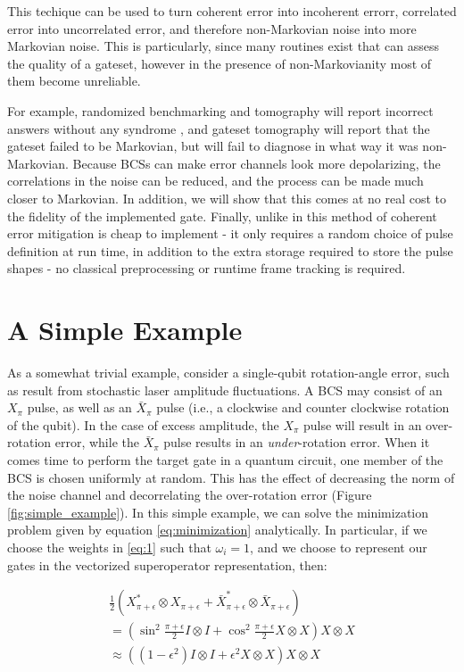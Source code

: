 \documentclass[aps,nofootinbib,pra,notitlepage,twocolumn]{revtex4-1}
\begin{document}
This techique can be used to turn coherent error into incoherent errorr, correlated error into uncorrelated error, and therefore non-Markovian noise into more Markovian noise. This is particularly, since many routines exist that can assess the quality of a gateset, however in the presence of non-Markovianity most of them become unreliable.

For example, randomized benchmarking and tomography will report incorrect answers without any syndrome \cite{Merkel2013}, and gateset tomography will report that the gateset failed to be Markovian, but will fail to diagnose in what way it was non-Markovian. Because BCSs can make error channels look more depolarizing, the correlations in the noise can be reduced, and the process can be made much closer to Markovian. In addition, we will show that this comes at no real cost to the fidelity of the implemented gate. Finally, unlike in \cite{Wallman2016, Campbell2017, Ware2018} this method of coherent error mitigation is cheap to implement - it only requires a random choice of pulse definition at run time, in addition to the extra storage required to store the pulse shapes - no classical preprocessing or runtime frame tracking is required.


\section{A Simple Example}
As a somewhat trivial example, consider a single-qubit rotation-angle error, such as result from stochastic laser amplitude fluctuations. A BCS may consist of an $X_\pi$ pulse, as well as an $\bar X_\pi$ pulse (i.e., a clockwise and counter clockwise rotation of the qubit). In the case of excess amplitude, the $X_\pi$ pulse will result in an over-rotation error, while the $\bar X_\pi$ pulse results in an \emph{under}-rotation error. When it comes time to perform the target gate in a quantum circuit, one member of the BCS is chosen uniformly at random. This has the effect of decreasing the norm of the noise channel and decorrelating the over-rotation error (Figure \ref{fig:simple_example}). In this simple example, we can solve the minimization problem given by equation \ref{eq:minimization} analytically. In particular, if we choose the weights in \ref{eq:1} such that $\omega_i=1$, and we choose to represent our gates in the vectorized superoperator representation, then:

\begin{equation}
  \begin{gathered}
    \frac{1}{2}(X^*_{\pi + \epsilon}\otimes X_{\pi + \epsilon} + \bar X^*_{\pi + \epsilon}\otimes \bar X_{\pi + \epsilon}) \\  
    = (\sin^2{\frac{\pi + \epsilon}{2}}I\otimes I + \cos^2{\frac{\pi + \epsilon}{2}}X\otimes X)X\otimes X \\
    \approx ((1 - \epsilon^2)I\otimes I + \epsilon^2X\otimes X)X\otimes X
  \end{gathered}
\end{equation}
 
\end{document}
